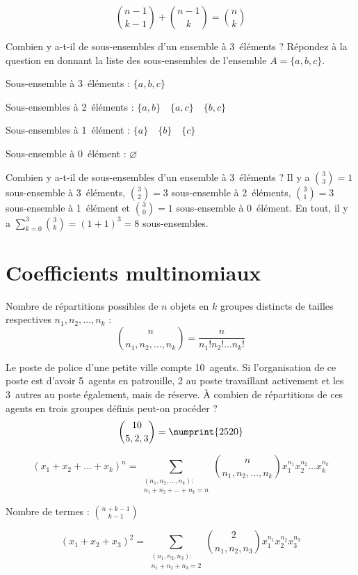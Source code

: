 \[\binom{n-1}{k-1} + \binom{n-1}{k} = \binom{n}{k}\]

 Combien y a-t-il de sous-ensembles d’un ensemble à 3~éléments ? Répondez à la question en donnant la liste des sous-ensembles de l’ensemble $A = \{a,b,c\}$.
\sol

Sous-ensemble à 3~éléments : $\{a,b,c\}$

Sous-ensembles à 2~éléments : $\{a,b\} \quad \{a,c\} \quad \{b,c\}$

Sous-ensembles à 1~élément : $\{a\} \quad \{b\} \quad \{c\}$

Sous-ensemble à 0~élément : $\varnothing$

\noindent Combien y a-t-il de sous-ensembles d’un ensemble à 3~éléments ?
 Il y a $\binom{3}{3}=1$ sous-ensemble à 3~éléments, $\binom{3}{2}=3$ sous-ensemble à 2~éléments, $\binom{3}{1}=3$ sous-ensemble à 1~élément et $\binom{3}{0}=1$ sous-ensemble à 0~élément. En tout, il y a $\sum_{k=0}^{3}\binom{3}{k} = (1+1)^3 = 8$ sous-ensembles.

\section{Coefficients multinomiaux}

Nombre de répartitions possibles de $n$ objets en $k$ groupes distincts de tailles respectives $n_1, n_2,\dots, n_k$ :
\[\binom{n}{n_1,n_2,\dots,n_k} = \frac{n}{n_1!n_2!\dots n_k!}\]


 Le poste de police d’une petite ville compte 10~agents. Si l’organisation de ce poste est d’avoir 5~agents en patrouille, 2 au poste travaillant activement et les 3~autres au poste également, mais de réserve. À combien de répartitions de ces agents en trois groupes définis peut-on procéder ?
\[\binom{10}{5,2,3} = \numprint{2520}\]

\[(x_1 + x_2 + \dots + x_k)^n = \sum_{\substack{(n_1,n_2,\dots,n_k):\\n_1+n_2+\dots+n_k=n}} \binom{n}{n_1,n_2,\dots,n_k} x_1^{n_1} x_2^{n_2} \dots x_k^{n_k}\]

Nombre de termes : $\binom{n+k-1}{k-1}$

\[(x_1 + x_2 + x_3)^2 = \sum_{\substack{(n_1,n_2,n_3):\\n_1+n_2+n_3=2}} \binom{2}{n_1,n_2,n_3} x_1^{n_1} x_2^{n_2} x_3^{n_3}\]

